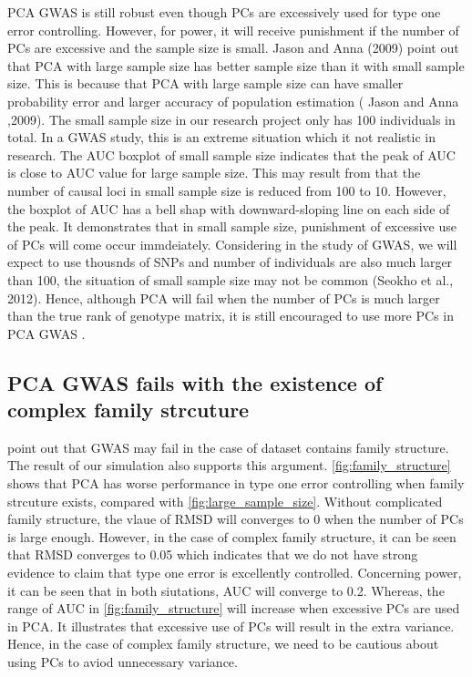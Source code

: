 \documentclass[12pt]{article}
\begin{document}
PCA GWAS is still robust even though PCs are excessively used for type one error controlling. However, for power, it will receive punishment if the number of PCs are excessive and the sample size is small.
Jason and Anna (2009) point out that PCA with large sample size has better sample size than it with small sample size.
This is because that PCA with large sample size can have smaller probability error and larger accuracy of population estimation ( Jason and Anna ,2009).
The small sample size in our research project only has 100 individuals in total.
In a GWAS study, this is an extreme situation which it not realistic in research.
The AUC boxplot of small sample size indicates that the peak of AUC is close to AUC value for large sample size.
This may result from that the number of causal loci in small sample size is reduced from 100 to 10.
However, the boxplot of AUC has a bell shap with downward-sloping line on each side of the peak.
It demonstrates that in small sample size, punishment of excessive use of PCs will come occur immdeiately.
Considering in the study of GWAS, we will expect to use thousnds of SNPs and number of individuals are also much larger than 100, the situation of small sample size may not be common (Seokho et al., 2012).
Hence, although PCA will fail when the number of PCs is much larger than the true rank of genotype matrix, it is still encouraged to use more PCs in PCA GWAS .

\subsection{PCA GWAS fails with the existence of complex family strcuture }

\citep{price_new_2010} point out that GWAS may fail in the case of dataset contains  family structure.
The result of our simulation also supports this argument.
\cref{fig:family_structure} shows that PCA has worse performance in type one error controlling when family strcuture exists, compared with \cref{fig:large_sample_size}.
Without complicated family structure, the vlaue of RMSD will converges to 0 when the number of PCs is large enough.
However, in the case of complex family structure, it can be seen that RMSD converges to 0.05 which indicates that we do not have strong evidence to claim that type one error is excellently controlled.
Concerning power, it can be seen that in both siutations, AUC will converge to 0.2.
Whereas, the range of AUC in \cref{fig:family_structure} will increase when excessive PCs are used in PCA.
It illustrates that excessive use of PCs will result in the extra variance. 
Hence, in the case of complex family structure, we need to be cautious about using PCs to aviod unnecessary variance. 
\end{document}
